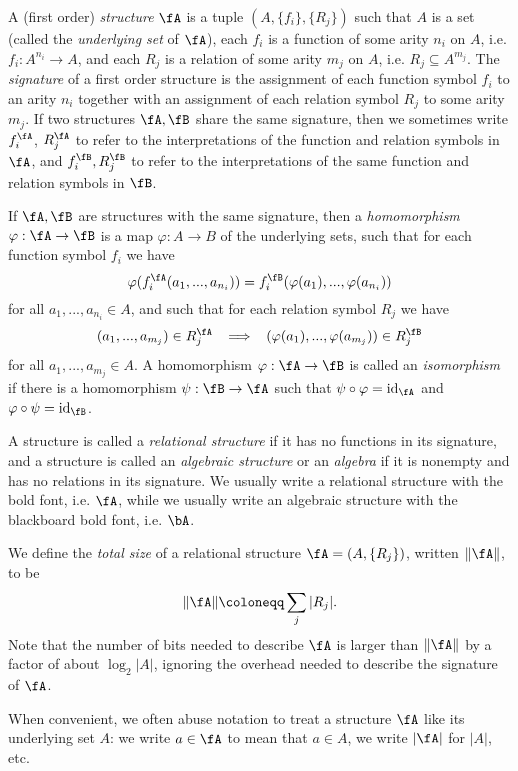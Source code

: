 \begin{defn} A (first order) \emph{structure} $\fA$ is a tuple $(A, \{f_i\}, \{R_j\})$ such that $A$ is a set (called the \emph{underlying set} of $\fA$), each $f_i$ is a function of some arity $n_i$ on $A$, i.e. $f_i : A^{n_i} \rightarrow A$, and each $R_j$ is a relation of some arity $m_j$ on $A$, i.e. $R_j \subseteq A^{m_j}$. The \emph{signature} of a first order structure is the assignment of each function symbol $f_i$ to an arity $n_i$ together with an assignment of each relation symbol $R_j$ to some arity $m_j$. If two structures $\fA, \fB$ share the same signature, then we sometimes write $f_i^\fA$, $R_j^\fA$ to refer to the interpretations of the function and relation symbols in $\fA$, and $f_i^\fB, R_j^\fB$ to refer to the interpretations of the same function and relation symbols in $\fB$.

If $\fA, \fB$ are structures with the same signature, then a \emph{homomorphism} $\varphi : \fA \rightarrow \fB$ is a map $\varphi : A \rightarrow B$ of the underlying sets, such that for each function symbol $f_i$ we have
\[
\varphi(f_i^\fA(a_1, ..., a_{n_i})) = f_i^\fB(\varphi(a_1), ..., \varphi(a_{n_i}))
\]
for all $a_1, ..., a_{n_i} \in A$, and such that for each relation symbol $R_j$ we have
\[
(a_1, ..., a_{m_j}) \in R_j^\fA \;\; \implies \;\; (\varphi(a_1), ..., \varphi(a_{m_j})) \in R_j^\fB
\]
for all $a_1, ..., a_{m_j} \in A$. A homomorphism $\varphi : \fA \rightarrow \fB$ is called an \emph{isomorphism} if there is a homomorphism $\psi : \fB \rightarrow \fA$ such that $\psi \circ \varphi = \operatorname{id}_{\fA}$ and $\varphi \circ \psi = \operatorname{id}_\fB$.

A structure is called a \emph{relational structure} if it has no functions in its signature, and a structure is called an \emph{algebraic structure} or an \emph{algebra} if it is nonempty and has no relations in its signature. We usually write a relational structure with the bold font, i.e. $\fA$, while we usually write an algebraic structure with the blackboard bold font, i.e. $\bA$.

We define the \emph{total size} of a relational structure $\fA = (A, \{R_j\})$, written $\|\fA\|$, to be
\[
\|\fA\| \coloneqq \sum_j |R_j|.
\]
Note that the number of bits needed to describe $\fA$ is larger than $\|\fA\|$ by a factor of about $\log_2 |A|$, ignoring the overhead needed to describe the signature of $\fA$.
\end{defn}

When convenient, we often abuse notation to treat a structure $\fA$ like its underlying set $A$: we write $a \in \fA$ to mean that $a \in A$, we write $|\fA|$ for $|A|$, etc.

